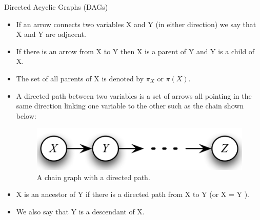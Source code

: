 \documentclass[handout]{beamer}
\begin{document}
\begin{frame}{Directed Acyclic Graphs (DAGs)}
\scriptsize{
\begin{itemize}
\item If an arrow connects two variables X and Y (in either direction) we say that X and Y are adjacent.


\item If there is an arrow from X to Y then X is a parent of Y and Y is a child of X.

\item The set of all parents of X is denoted by $\pi_{X}$ or $\pi(X)$.

\item A directed path between two variables is a set of arrows all pointing in the same direction linking one variable to the
other such as the chain shown below:

\begin{figure}[h!]
	\centering
	\includegraphics[scale=0.5]{pics/dag2.png}
	\caption{A chain graph with a directed path.}
	\end{figure} 

\item X is an ancestor of Y if there is a directed path from X to Y (or X = Y ).

\item We also say that Y is a descendant of X.
 
\end{itemize}



} 

\end{frame}
\end{document}
